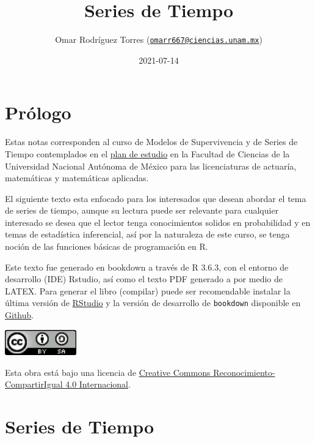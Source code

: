 \documentclass[
  spanish,
]{book}
\title{Series de Tiempo}
\author{Omar Rodríguez Torres (\href{mailto:omarr667@ciencias.unam.mx}{\nolinkurl{omarr667@ciencias.unam.mx}})}
\date{2021-07-14}
\theoremstyle{remark}
\begin{document}
\maketitle

{
\setcounter{tocdepth}{1}
\tableofcontents
}
\hypertarget{pruxf3logo}{%
\chapter*{Prólogo}\label{pruxf3logo}}

Estas notas corresponden al curso de Modelos de Supervivencia y de Series de Tiempo contemplados en el \href{http://www.fciencias.unam.mx/licenciatura/asignaturas/2017/1739}{plan de estudio} en la Facultad de Ciencias de la Universidad Nacional Autónoma de México para las licenciaturas de actuaría, matemáticas y matemáticas aplicadas.

El siguiente texto esta enfocado para los interesados que desean abordar el tema de series de tiempo, aunque su lectura puede ser relevante para cualquier interesado se desea que el lector tenga conocimientos solidos en probabilidad y en temas de estadística inferencial, así por la naturaleza de este curso, se tenga noción de las funciones básicas de programación en R.

Este texto fue generado en bookdown a través de R 3.6.3, con el entorno de desarrollo (IDE) Rstudio, así como el texto PDF generado a por medio de LATEX. Para generar el libro (compilar) puede ser recomendable instalar la última versión de \href{(https://www.rstudio.com/products/rstudio/download/)}{RStudio} y la versión de desarrollo de \texttt{bookdown} disponible en \href{https://github.com/rstudio/bookdown}{Github}.

\begin{flushleft}\includegraphics[width=1.22in]{images/by-sa-88x31} \end{flushleft}

Esta obra está bajo una licencia de \href{https://creativecommons.org/licenses/by-sa/4.0/deed.es}{Creative Commons Reconocimiento-CompartirIgual 4.0 Internacional}.

\hypertarget{series-de-tiempo}{%
\chapter{Series de Tiempo}\label{series-de-tiempo}}
\end{document}
